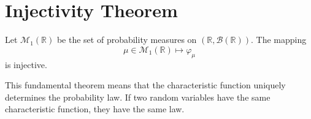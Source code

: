 \section{Injectivity Theorem}%
\begin{theorem}
Let $\mathcal{M}_1(\mathbb{R})$ be the set of probability measures on $(\mathbb{R}, \mathcal{B}(\mathbb{R}))$. The mapping
\[ \mu \in \mathcal{M}_1(\mathbb{R}) \mapsto \varphi_{\mu} \]
is injective.
\end{theorem}%
This fundamental theorem means that the characteristic function uniquely determines the probability law. If two random variables have the same characteristic function, they have the same law.%
